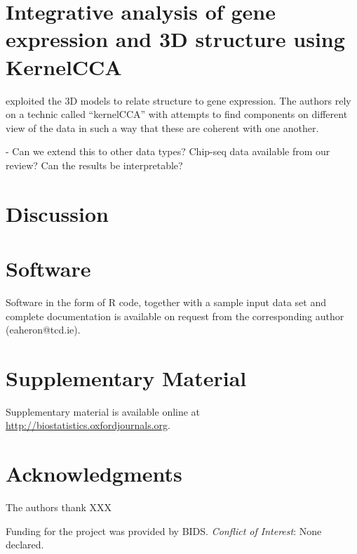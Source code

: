 \documentclass[letterpaper,12pt]{article}
\begin{document}
\section{Integrative analysis of gene expression and 3D structure using KernelCCA}

\citet{ay:three-dimensional}  exploited the 3D models to relate structure to
gene expression. The authors rely on a technic called ``kernelCCA'' with
attempts to find components on different view of the data in such a way that
these are coherent with one another.

- Can we extend this to other data types? Chip-seq data available from our
review? Can the results be interpretable?


\section{Discussion}
\label{sec4}



\section{Software}
\label{sec5}

Software in the form of R code, together with a sample
input data set and complete documentation is available on
request from the corresponding author (eaheron@tcd.ie).


\section{Supplementary Material}
\label{sec6}

Supplementary material is available online at
\url{http://biostatistics.oxfordjournals.org}.


\section*{Acknowledgments}

The authors thank XXX

Funding for the project was provided by BIDS.
{\it Conflict of Interest}: None declared.






\begin{figure}[!p]
\centering
\caption{}
\label{Fig1}
\end{figure}
\end{document}
